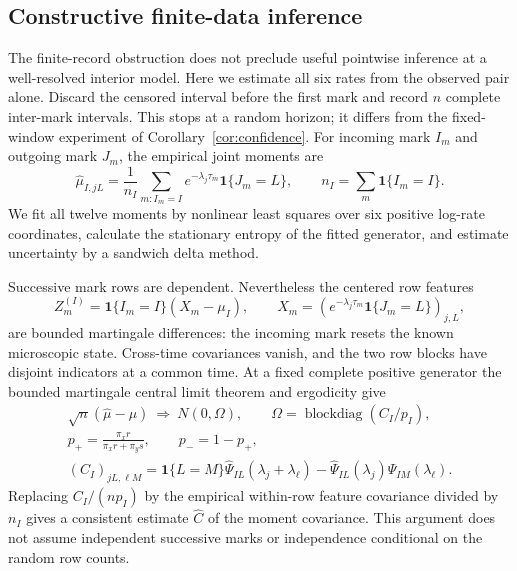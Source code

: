 
\subsection{Constructive finite-data inference}\label{subsec:constructive-inference}

The finite-record obstruction does not preclude useful pointwise inference
at a well-resolved interior model. Here we estimate all six rates from the
observed pair alone. Discard the censored interval before the first mark and
record $n$ complete inter-mark intervals. This stops at a random horizon;
it differs from the fixed-window experiment of Corollary~\ref{cor:confidence}.
For incoming mark $I_m$ and outgoing mark $J_m$, the empirical joint moments are
\begin{equation}
 \widehat\mu_{I,jL}
 =\frac1{n_I}\sum_{m:I_m=I}
 e^{-\lambda_j\tau_m}\mathbf1\{J_m=L\},
 \qquad n_I=\sum_m\mathbf1\{I_m=I\}.\label{eq:empirical-laplace}
\end{equation}
We fit all twelve moments by nonlinear least squares over six positive
log-rate coordinates, calculate the stationary entropy of the fitted
generator, and estimate uncertainty by a sandwich delta method.

Successive mark rows are dependent. Nevertheless the centered row features
\begin{equation}
 Z_m^{(I)}=\mathbf1\{I_m=I\}(X_m-\mu_I),\qquad
 X_m=(e^{-\lambda_j\tau_m}\mathbf1\{J_m=L\})_{j,L},
\end{equation}
are bounded martingale differences: the incoming mark resets the known
microscopic state. Cross-time covariances vanish, and the two row blocks
have disjoint indicators at a common time. At a fixed complete positive
generator the bounded martingale central limit theorem and ergodicity give
\begin{gather}
 \sqrt n(\widehat\mu-\mu)\ \Rightarrow\ N(0,\Omega),\qquad
 \Omega=\operatorname{blockdiag}(C_I/p_I),\label{eq:moment-clt}\\
 p_+=\frac{\pi_xr}{\pi_xr+\pi_ys},\qquad p_-=1-p_+,\\
 (C_I)_{jL,\ell M}
 =\mathbf1\{L=M\}\widehat\Psi_{IL}(\lambda_j+\lambda_\ell)
  -\widehat\Psi_{IL}(\lambda_j)\widehat\Psi_{IM}(\lambda_\ell).
 \label{eq:moment-covariance}
\end{gather}
Replacing $C_I/(np_I)$ by the empirical within-row feature covariance divided
by $n_I$ gives a consistent estimate $\widehat C$ of the moment covariance.
This argument does not assume independent successive marks or independence
conditional on the random row counts.

